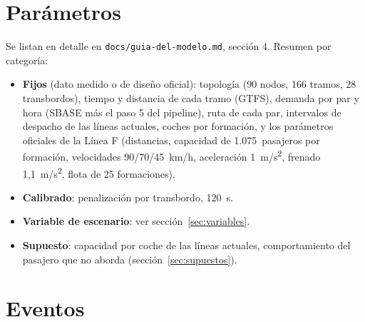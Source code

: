 \documentclass{article}
\begin{document}
\section{Parámetros}
\label{sec:parametros}

Se listan en detalle en \texttt{docs/guia-del-modelo.md}, sección 4. Resumen por
categoría:

\begin{itemize}
  \item \textbf{Fijos} (dato medido o de diseño oficial): topología (90 nodos, 166
    tramos, 28 transbordos), tiempo y distancia de cada tramo (GTFS), demanda por
    par y hora (SBASE más el paso 5 del pipeline), ruta de cada par, intervalos de
    despacho de las líneas actuales, coches por formación, y los parámetros
    oficiales de la Línea F (distancias, capacidad de 1.075~pasajeros por
    formación, velocidades 90/70/45~km/h, aceleración 1~m/s\textsuperscript{2},
    frenado 1,1~m/s\textsuperscript{2}, flota de 25 formaciones).
  \item \textbf{Calibrado}: penalización por transbordo, 120~s.
  \item \textbf{Variable de escenario}: ver sección~\ref{sec:variables}.
  \item \textbf{Supuesto}: capacidad por coche de las líneas actuales,
    comportamiento del pasajero que no aborda (sección~\ref{sec:supuestos}).
\end{itemize}

\section{Eventos}
\end{document}
